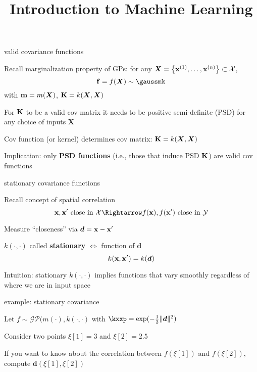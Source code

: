 \documentclass[11pt,compress,t,notes=noshow, xcolor=table]{beamer}
\title{Introduction to Machine Learning}
\begin{document}

\begin{framei}[sep=L]{valid covariance functions}
\item Recall marginalization property of GPs: for any $\bm{X} = \left\{ \mathbf{x}^{(1)}, \ldots, \mathbf{x}^{(n)}\right\} \subset \mathcal{X}$,
$$\fv = f(\bm{X}) \sim \gaussmk$$
with $\mathbf{m} = m(\bm{X})$, $\mathbf{K} = k(\bm{X}, \bm{X})$
\item For $\mathbf{K}$ to be a valid cov matrix it needs to be positive semi-definite (PSD) for any choice of inputs $\bm{X}$
\item Cov function (or kernel) determines cov matrix: $\mathbf{K} = k(\bm{X}, \bm{X})$
\item Implication: only \textbf{PSD functions} (i.e., those that induce PSD $\mathbf{K}$) are valid cov functions
\end{framei}

\begin{framei}[sep=L]{stationary covariance functions}
\item Recall concept of spatial correlation
$$\xv, \xv^\prime \text{ close in } \Xspace \Rightarrow f(\xv), f(\xv^\prime) \text{ close in } \Yspace$$
\item Measure ``closeness'' via $\bm{d} = \mathbf{x} - \mathbf{x}^\prime$
\item $k(\cdot, \cdot)$ called \textbf{stationary} $\Leftrightarrow$ function of $\bm{d}$ 
$$k(\mathbf{x}, \mathbf{x}^\prime) = k(\bm{d})$$
\item Intuition: stationary $k(\cdot, \cdot)$ implies functions that vary smoothly regardless of where we are in input space
\end{framei}

\begin{framei}{example: stationary covariance}
\item Let $f \sim \mathcal{GP}(m(\cdot), k(\cdot, \cdot)$ with $\kxxp = \exp(-\tfrac{1}{2}\|\bm{d}\|^2)$
\item Consider two points $\xi[1] = 3$ and $\xi[2] = 2.5$
\item If you want to know about the correlation between $f(\xi[1])$ and $f(\xi[2])$, compute $\bm{d}(\xi[1], \xi[2])$
\vfill
{}
\end{framei}
\end{document}
